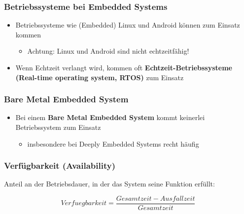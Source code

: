 \subsubsection{Betriebssysteme bei Embedded Systems}
\begin{itemize}
  \item Betriebssysteme wie (Embedded) Linux und Android können zum Einsatz kommen
        \begin{itemize}
          \item Achtung: Linux und Android sind nicht echtzeitfähig!
        \end{itemize}
  \item Wenn Echtzeit verlangt wird, kommen oft \textbf{Echtzeit-Betriebssysteme (Real-time operating system, RTOS)} zum Einsatz
\end{itemize}

\subsubsection{Bare Metal Embedded System}
\begin{itemize}
  \item Bei einem \textbf{Bare Metal Embedded System} kommt keinerlei Betriebssystem zum Einsatz
        \begin{itemize}
          \item insbesondere bei Deeply Embedded Systems recht häufig
        \end{itemize}
\end{itemize}

\subsubsection{Verfügbarkeit (Availability)}
Anteil an der Betriebsdauer, in  der das System seine Funktion
erfüllt:

\begin{equation}
  Verfuegbarkeit = \frac{Gesamtzeit-Ausfallzeit}{Gesamtzeit}
\end{equation}

